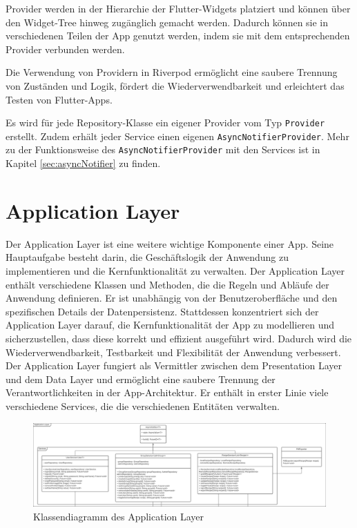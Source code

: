 \documentclass{entwurfsheft}
\begin{document}
Provider werden in der Hierarchie der Flutter-Widgets platziert und können über den Widget-Tree hinweg zugänglich gemacht werden. Dadurch können sie in verschiedenen Teilen der App genutzt werden, indem sie mit dem entsprechenden Provider verbunden werden.

Die Verwendung von Providern in Riverpod ermöglicht eine saubere Trennung von Zuständen und Logik, fördert die Wiederverwendbarkeit und erleichtert das Testen von Flutter-Apps.

Es wird für jede Repository-Klasse ein eigener Provider vom Typ \texttt{Provider} erstellt. Zudem erhält jeder Service einen eigenen \texttt{AsyncNotifierProvider}. Mehr zu der Funktionsweise des \texttt{AsyncNotifierProvider} mit den Services ist in Kapitel \ref{sec:asyncNotifier} zu finden.

\newpage
\section{Application Layer}
Der Application Layer ist eine weitere wichtige Komponente einer App. Seine Hauptaufgabe besteht darin, die Geschäftslogik der Anwendung zu implementieren und die Kernfunktionalität zu verwalten. Der Application Layer enthält verschiedene Klassen und Methoden, die die Regeln und Abläufe der Anwendung definieren. Er ist unabhängig von der Benutzeroberfläche und den spezifischen Details der Datenpersistenz. Stattdessen konzentriert sich der Application Layer darauf, die Kernfunktionalität der App zu modellieren und sicherzustellen, dass diese korrekt und effizient ausgeführt wird. Dadurch wird die Wiederverwendbarkeit, Testbarkeit und Flexibilität der Anwendung verbessert. Der Application Layer fungiert als Vermittler zwischen dem Presentation Layer und dem Data Layer und ermöglicht eine saubere Trennung der Verantwortlichkeiten in der App-Architektur.
Er enthält in erster Linie viele verschiedene Services, die die verschiedenen Entitäten verwalten.
\begin{figure}[htp]
    \centering
    \includegraphics[width = \textwidth]{images/applicationLayer/applicationLayer.pdf}
    \caption{Klassendiagramm des Application Layer}
    \label{fig:application-layer}
\end{figure}
\end{document}
